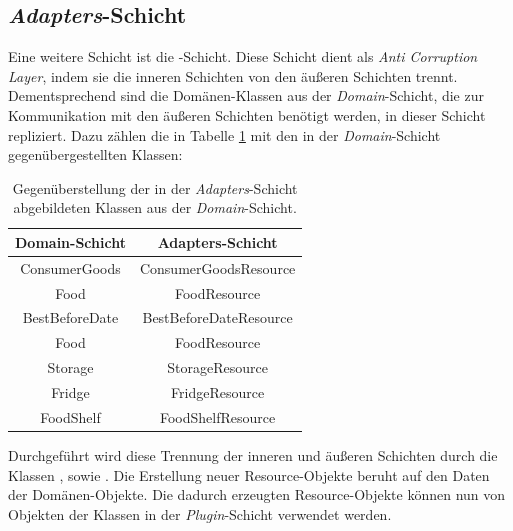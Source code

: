 
\subsection*{\textit{Adapters}-Schicht}
Eine weitere Schicht ist die \href{https://github.com/lucasmerkel/dhbw-advancedswe-programmentwurf/tree/main/swe_programmentwurf/consumergoods-inventory-planner/1-cip-adapters}{}-Schicht.
Diese Schicht dient als \textit{Anti Corruption Layer}, indem sie die inneren Schichten von den äußeren Schichten trennt.
Dementsprechend sind die Domänen-Klassen aus der \textit{Domain}-Schicht, die zur Kommunikation mit den äußeren Schichten benötigt werden, in dieser Schicht repliziert.
Dazu zählen die in Tabelle \ref{clean-architecture>klassen-adapters} mit den in der \textit{Domain}-Schicht gegenübergestellten Klassen:

\begin{table}[H]
    \centering
\begin{tabular}[h]{|c|c|}
	\hline
	\textbf{Domain-Schicht} & \textbf{Adapters-Schicht} \\
	\hline
	ConsumerGoods & ConsumerGoodsResource \\
	\hline
	Food & FoodResource \\
	\hline
	BestBeforeDate & BestBeforeDateResource \\
	\hline
	Food & FoodResource \\
	\hline
	Storage & StorageResource \\
	\hline
	Fridge & FridgeResource \\
	\hline
	FoodShelf & FoodShelfResource \\
    \hline
\end{tabular}
    \caption{Gegenüberstellung der in der \textit{Adapters}-Schicht abgebildeten Klassen aus der \textit{Domain}-Schicht.}
    \label{clean-architecture>klassen-adapters}
\end{table}

Durchgeführt wird diese Trennung der inneren und äußeren Schichten durch die Klassen \href{https://github.com/lucasmerkel/dhbw-advancedswe-programmentwurf/blob/d5c89113d12c3b877ddc4d6a99225b277ddd468f/swe_programmentwurf/consumergoods-inventory-planner/1-cip-adapters/src/main/java/de/dhbw/cip/adapters/ConsumerGoodsToConsumerGoodsResourceMapper.java}{}, \href{https://github.com/lucasmerkel/dhbw-advancedswe-programmentwurf/blob/d5c89113d12c3b877ddc4d6a99225b277ddd468f/swe_programmentwurf/consumergoods-inventory-planner/1-cip-adapters/src/main/java/de/dhbw/cip/adapters/FridgeToFridgeResourceMapper.java}{} sowie \href{https://github.com/lucasmerkel/dhbw-advancedswe-programmentwurf/blob/d5c89113d12c3b877ddc4d6a99225b277ddd468f/swe_programmentwurf/consumergoods-inventory-planner/1-cip-adapters/src/main/java/de/dhbw/cip/adapters/FoodShelfToFoodShelfRessourceMapper.java}{}.
Die Erstellung neuer Resource-Objekte beruht auf den Daten der Domänen-Objekte.
Die dadurch erzeugten Resource-Objekte können nun von Objekten der Klassen in der \textit{Plugin}-Schicht verwendet werden.

